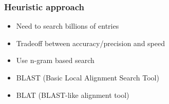 %
%
\subsubsection*{Heuristic approach} 
\begin{itemize}
\item Need to search billions of entries
\item Tradeoff between accuracy/precision and speed
\item Use n-gram based search
\item BLAST (Basic Local Alignment Search Tool)
\item BLAT (BLAST-like alignment tool)
\end{itemize}

\bigskip 

%
